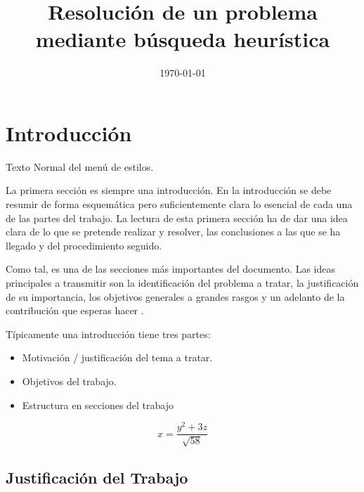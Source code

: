 \documentclass[12pt,a4paper]{proyectoinnovacion}
\title{Resolución de un problema mediante búsqueda heurística}
\date{\today}
\begin{document}
\maketitle

{
  \hypersetup{linkcolor=black}
  \tableofcontents
}
\pagebreak

\section{Introducción}

Texto Normal del menú de estilos.

La primera sección es siempre una introducción. En la introducción se debe resumir de forma esquemática pero suficientemente clara lo esencial de cada una de las partes del trabajo. La lectura de esta primera sección ha de dar una idea clara de lo que se pretende realizar y resolver, las conclusiones a las que se ha llegado y del procedimiento seguido.

Como tal, es una de las secciones más importantes del documento. Las ideas principales a transmitir son la identificación del problema a tratar, la justificación de su importancia, los objetivos generales a grandes rasgos y un adelanto de la contribución que esperas hacer \parencite{rialland2021}.

Típicamente una introducción tiene tres partes:

\begin{itemize}
  \item Motivación / justificación del tema a tratar.
  \item Objetivos del trabajo.
  \item Estructura en secciones del trabajo
\end{itemize}


$$
x = \frac{y^2 + 3z}{\sqrt{58}}
$$


\subsection{Justificación del Trabajo}
\end{document}
